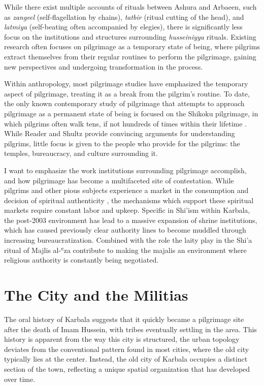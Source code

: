 While there exist multiple accounts of rituals between Ashura and Arbaeen, such as \emph{zangeel} (self-flagellation by chains), \emph{tatbir} (ritual cutting of the head), and \emph{latmiya} (self-beating often accompanied by elegies), there is significantly less focus on the institutions and structures surrounding \emph{husseiniyya} rituals. Existing research often focuses on pilgrimage as a temporary state of being, where pilgrims extract themselves from their regular routines to perform the pilgrimage, gaining new perspectives and undergoing transformation in the process.

Within anthropology, most pilgrimage studies have emphasized the temporary aspect of pilgrimage, treating it as a break from the pilgrim's routine. To date, the only known contemporary study of pilgrimage that attempts to approach pilgrimage as a permanent state of being is focused on the Shikoku pilgrimage, in which pilgrims often walk tens, if not hundreds of times within their lifetime \cite[9]{reader_pilgrims_2021}. While Reader and Shultz provide convincing arguments for understanding pilgrims, little focus is given to the people who provide for the pilgrims: the temples, bureaucracy, and culture surrounding it.



I want to emphasize the work institutions surrounding pilgrimage accomplish, and how pilgrimage has become a multifaceted site of contestation. While pilgrims and other pious subjects experience a market in the consumption and decision of spiritual authenticity \cite{moufahim_pilgrimage_2018}\cite{mujtaba_husein_phenomenological_2018}, the mechanisms which support these spiritual markets require constant labor and upkeep. Specific in Shi'ism within Karbala, the post-2003 environment has lead to a massive expansion of shrine institutions, which has caused previously clear authority lines to become muddled through increasing bureaucratization. Combined with the role the laity play in the Shi'a ritual of Majlis al-ʿza contribute to making the majalis an environment where religious authority is constantly being negotiated. 

\section{The City and the Militias}
The oral history of Karbala suggests that it quickly became a pilgrimage site after the death of Imam Hussein, with tribes eventually settling in the area. This history is apparent from the way this city is structured, the urban topology deviates from the conventional pattern found in most cities, where the old city typically lies at the center. Instead, the old city of Karbala occupies a distinct section of the town, reflecting a unique spatial organization that has developed over time. 

